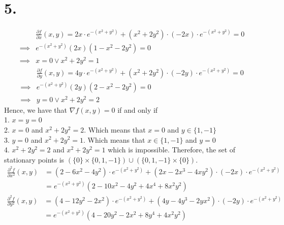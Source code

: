 \documentclass[11pt]{article}
\begin{document}
\section*{5.}
\begin{equation*}
\begin{aligned}
&\frac{\partial f}{\partial x}(x,y) = 2x \cdot e^{-(x^2+y^2)} + (x^2+2y^2) \cdot (-2x) \cdot e^{-(x^2+y^2)} = 0 \\
\implies & e^{-(x^2+y^2)}(2x)(1-x^2-2y^2) = 0 \\
\implies & x = 0 \lor x^2+2y^2 = 1
\end{aligned}
\end{equation*}
\begin{equation*}
\begin{aligned}
&\frac{\partial f}{\partial y}(x,y) = 4y \cdot e^{-(x^2+y^2)} + (x^2+2y^2) \cdot (-2y) \cdot e^{-(x^2+y^2)} = 0 \\
\implies & e^{-(x^2+y^2)}(2y)(2-x^2-2y^2) = 0 \\
\implies & y = 0 \lor x^2+2y^2 = 2
\end{aligned}
\end{equation*}
Hence, we have that $\nabla f(x,y) = 0$ if and only if \\
1. $x=y=0$ \\
2. $x=0$ and $x^2+2y^2 = 2$. Which means that $x=0$ and $y \in \{1,-1\}$ \\
3. $y=0$ and $x^2+2y^2 = 1$. Which means that $x \in \{1,-1\}$ and $y=0$ \\
4. $x^2+2y^2 = 2$ and $x^2+2y^2=1$ which is impossible.
Therefore, the set of stationary points is $(\{0\}\times \{0,1,-1\}) \cup (\{0,1,-1\} \times \{0\})$.
\begin{equation*}
\begin{aligned}
\frac{\partial^2 f}{\partial x^2}(x,y) &= (2-6x^2-4y^2) \cdot e^{-(x^2+y^2)} + (2x-2x^3-4xy^2) \cdot (-2x) \cdot e^{-(x^2+y^2)}\\
&= e^{-(x^2+y^2)}(2-10x^2-4y^2+4x^4+8x^2y^2) 
\end{aligned}
\end{equation*}
\begin{equation*}
\begin{aligned}
\frac{\partial^2 f}{\partial y^2}(x,y) &= (4-12y^2-2x^2) \cdot e^{-(x^2+y^2)} + (4y-4y^3-2yx^2) \cdot (-2y) \cdot e^{-(x^2+y^2)}\\
&= e^{-(x^2+y^2)}(4-20y^2-2x^2+8y^4+4x^2y^2) 
\end{aligned}
\end{equation*}
\end{document}
